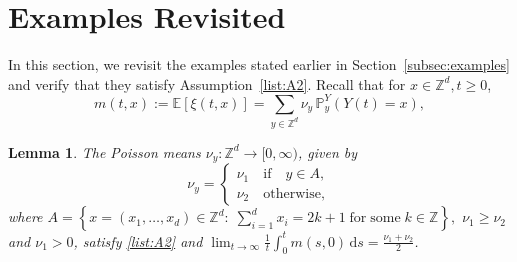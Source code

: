 \documentclass{article}[12pt]
\newtheorem{lemma}{Lemma}[section]
\theoremstyle{definition}
\newcommand{\Z}{\mathbb{Z}}
\newcommand{\pr}{\mathbb{P}}
\newcommand{\E}{\mathbb{E}}
\newcommand{\1}{\mathbbm{1}}
\newcommand{\dd }{\mathrm{d} }
\begin{document}
\section{Examples Revisited}
\label{sec:exrev}
In this section, we revisit the examples stated earlier in Section~\ref{subsec:examples} and verify that they satisfy Assumption~\ref{list:A2}. Recall that for $x\in \Z^d, t\ge 0$, 
\begin{equation*}
m(t,x) := \E[\xi(t,x)]= \sum_{y\in\mathbb{Z}^d} \nu_y\,\pr_y^Y(Y(t)=x),
\end{equation*}

 \begin{lemma}
  The Poisson means $\nu_y:\Z^d \to [0,\infty)$, given by
   \begin{equation}
    \nu_y = \left\{\begin{array}{l}
      \nu_1 \quad \text{if} \quad y \in A,\\
      \nu_2  \quad \text{otherwise},
    \end{array}\right.
  \end{equation}
  where $A = \left\{ x = (x_1, \ldots, x_d) \in \mathbb{Z}^d :\;
  \sum_{i = 1}^d x_i = 2 k + 1 \;\text{for}\;
  \text{some}\;k \in \mathbb{Z} \right\},$ $\nu_1 \geq \nu_2$ and $\nu_1>0$, 
 satisfy \ref{list:A2} and $\lim_{t\to\infty}\frac{1}{t}\int_0^t m(s,0)\,\dd s = \frac{\nu_1 + \nu_2}{2}$.
  \label{clm:periodiccase}
  \end{lemma}
\end{document}
